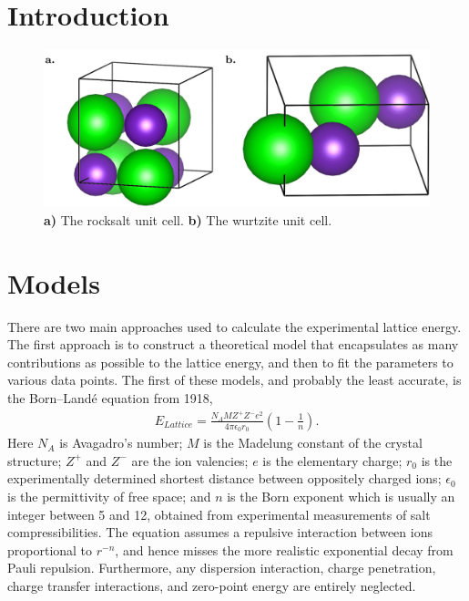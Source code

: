 \documentclass[titlepage,11pt]{article}
\begin{document}
\section{Introduction}
%
\begin{figure}
	\includegraphics[width=\textwidth]{figures/Wurtzite_Rocksalt.png}
	\caption{\label{fig:structures} \textbf{a)} The rocksalt unit cell. \textbf{b)} The wurtzite unit cell.}
\end{figure}
%
		
\section{Models}

There are two main approaches used to calculate the experimental lattice energy. The first approach is to construct a theoretical model that encapsulates as many contributions as possible to the lattice energy, and then to fit the parameters to various data points. The first of these models, and probably the least accurate, is the Born–Land\'{e} equation from 1918,~\cite{born1918absolute}
\begin{align}
E_{Lattice} = \frac { N _ { A } M Z ^ { + } Z ^ { - } e ^ { 2 } } { 4 \pi \epsilon _ { 0 } r _ { 0 } } \left( 1 - \frac { 1 } { n } \right).
\label{eq:BornLande}
\end{align}
Here $N_{A}$ is Avagadro's number; $M$ is the Madelung constant of the crystal structure; $Z^{+}$ and $Z^{-}$ are the ion valencies; $e$ is the elementary charge; $r_{0}$ is the experimentally determined shortest distance between oppositely charged ions; $\epsilon _ { 0 }$ is the permittivity of free space; and $n$ is the Born exponent which is usually an integer between 5 and 12, obtained from experimental measurements of salt compressibilities. The equation assumes a repulsive interaction between ions proportional to $r^{-n}$, and hence misses the more realistic exponential decay from Pauli repulsion. Furthermore, any dispersion interaction, charge penetration, charge transfer interactions, and zero-point energy are entirely neglected. 
\end{document}
